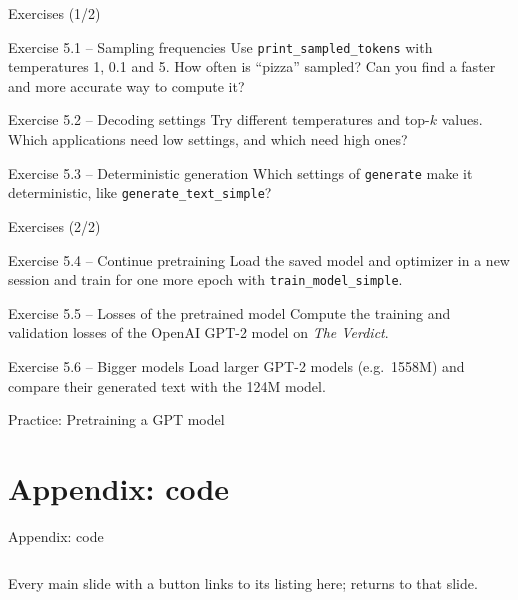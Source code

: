 \documentclass[aspectratio=169]{beamer}
\begin{document}
	\begin{frame}{Exercises (1/2)}
		\begin{block}{Exercise 5.1 -- Sampling frequencies}
			\small Use \texttt{print\_sampled\_tokens} with temperatures 1, 0.1 and 5. How often is ``pizza'' sampled? Can you find a faster and more accurate way to compute it?
		\end{block}
		\begin{block}{Exercise 5.2 -- Decoding settings}
			\small Try different temperatures and top-$k$ values. Which applications need low settings, and which need high ones?
		\end{block}
		\begin{block}{Exercise 5.3 -- Deterministic generation}
			\small Which settings of \texttt{generate} make it deterministic, like \texttt{generate\_text\_simple}?
		\end{block}
	\end{frame}

	\begin{frame}{Exercises (2/2)}
		\begin{block}{Exercise 5.4 -- Continue pretraining}
			\small Load the saved model and optimizer in a new session and train for one more epoch with \texttt{train\_model\_simple}.
		\end{block}
		\begin{block}{Exercise 5.5 -- Losses of the pretrained model}
			\small Compute the training and validation losses of the OpenAI GPT-2 model on \emph{The Verdict}.
		\end{block}
		\begin{block}{Exercise 5.6 -- Bigger models}
			\small Load larger GPT-2 models (e.g.\ 1558M) and compare their generated text with the 124M model.
		\end{block}
	\end{frame}

	\begin{frame}[standout]
		Practice: Pretraining a GPT model
	\end{frame}


	\appendix
	\AtBeginSection[]{}
	\AtBeginSubsection[]{}
	\section{Appendix: code}
	\begin{frame}{Appendix: code}
		\begin{columns}[T]
			\tableofcontents[sections={\value{section}},hideothersubsections]
			\small Every main slide with a  button links to its listing here;  returns to that slide.
		\end{columns}
	\end{frame}
\end{document}
